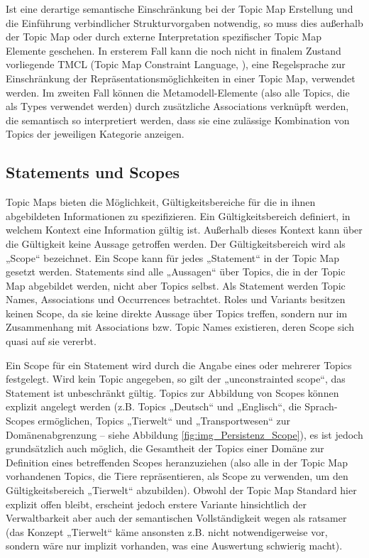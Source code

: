 Ist eine derartige semantische Einschränkung bei der Topic Map Erstellung und die Einführung verbindlicher Strukturvorgaben notwendig, so muss dies außerhalb der Topic Map oder durch externe Interpretation spezifischer Topic Map Elemente geschehen. In ersterem Fall kann die noch nicht in finalem Zustand vorliegende TMCL (Topic Map Constraint Language, \citep{TMCL08}), eine Regelsprache zur Einschränkung der Repräsentationsmöglichkeiten in einer Topic Map, verwendet werden. Im zweiten Fall können die Metamodell-Elemente (also alle Topics, die als Types verwendet werden) durch zusätzliche Associations verknüpft werden, die semantisch so interpretiert werden, dass sie eine zulässige Kombination von Topics der jeweiligen Kategorie anzeigen.


\subsection{Statements und Scopes} %
\label{sub:scopes}

Topic Maps bieten die Möglichkeit, Gültigkeitsbereiche für die in ihnen abgebildeten Informationen zu spezifizieren. Ein Gültigkeitsbereich definiert, in welchem Kontext eine Information gültig ist. Außerhalb dieses Kontext kann über die Gültigkeit keine Aussage getroffen werden. Der Gültigkeitsbereich wird als „Scope“ bezeichnet. Ein Scope kann für jedes „Statement“ in der Topic Map gesetzt werden. Statements sind alle „Aussagen“ über Topics, die in der Topic Map abgebildet werden, nicht aber Topics selbst. Als Statement werden Topic Names, Associations und Occurrences betrachtet. Roles und Variants besitzen keinen Scope, da sie keine direkte Aussage über Topics treffen, sondern nur im Zusammenhang mit Associations bzw. Topic Names existieren, deren Scope sich quasi auf sie vererbt.

Ein Scope für ein Statement wird durch die Angabe eines oder mehrerer Topics festgelegt. Wird kein Topic angegeben, so gilt der „unconstrainted scope“, das Statement ist unbeschränkt gültig. Topics zur Abbildung von Scopes können explizit angelegt werden (z.B. Topics „Deutsch“ und „Englisch“, die Sprach-Scopes ermöglichen, Topics „Tierwelt“ und „Transportwesen“ zur Domänenabgrenzung -- siehe Abbildung \ref{fig:img_Persistenz_Scope}), es ist jedoch grundsätzlich auch möglich, die Gesamtheit der Topics einer Domäne zur Definition eines betreffenden Scopes heranzuziehen (also alle in der Topic Map vorhandenen Topics, die Tiere repräsentieren, als Scope zu verwenden, um den Gültigkeitsbereich „Tierwelt“ abzubilden). Obwohl der Topic Map Standard hier explizit offen bleibt, erscheint jedoch erstere Variante hinsichtlich der Verwaltbarkeit aber auch der semantischen Vollständigkeit wegen als ratsamer (das Konzept „Tierwelt“ käme ansonsten z.B. nicht notwendigerweise vor, sondern wäre nur implizit vorhanden, was eine Auswertung schwierig macht).

